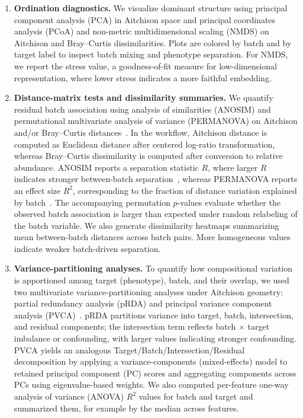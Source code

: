\documentclass[11pt,letterpaper]{article}
\begin{document}
\begin{enumerate}
\renewcommand{\labelenumi}{(\roman{enumi})}

\item \textbf{Ordination diagnostics.}
We visualize dominant structure using principal component analysis (PCA) in Aitchison space and principal coordinates analysis (PCoA) and non-metric multidimensional scaling (NMDS) on Aitchison and Bray--Curtis dissimilarities. Plots are colored by batch and by target label to inspect batch mixing and phenotype separation. For NMDS, we report the stress value, a goodness-of-fit measure for low-dimensional representation, where lower stress indicates a more faithful embedding.

\item \textbf{Distance-matrix tests and dissimilarity summaries.}
We quantify residual batch association using analysis of similarities (ANOSIM) and permutational multivariate analysis of variance (PERMANOVA) on Aitchison and/or Bray--Curtis distances~\cite{Li2019MiPro,braycurtis1957}. In the workflow, Aitchison distance is computed as Euclidean distance after centered log-ratio transformation, whereas Bray--Curtis dissimilarity is computed after conversion to relative abundance. ANOSIM reports a separation statistic $R$, where larger $R$ indicates stronger between-batch separation~\cite{Clarke1993ANOSIM}, whereas PERMANOVA reports an effect size $R^2$, corresponding to the fraction of distance variation explained by batch~\cite{anderson2001permanova}. The accompanying permutation $p$-values evaluate whether the observed batch association is larger than expected under random relabeling of the batch variable. We also generate dissimilarity heatmaps summarizing mean between-batch distances across batch pairs. More homogeneous values indicate weaker batch-driven separation.

\item \textbf{Variance-partitioning analyses.}
To quantify how compositional variation is apportioned among target (phenotype), batch, and their overlap, we used two multivariate variance-partitioning analyses under Aitchison geometry: partial redundancy analysis (pRDA) and principal variance component analysis (PVCA)~\cite{Wang2023PLSDABatch}. pRDA partitions variance into target, batch, intersection, and residual components; the intersection term reflects batch $\times$ target imbalance or confounding, with larger values indicating stronger confounding. PVCA yields an analogous Target/Batch/Intersection/Residual decomposition by applying a variance-components (mixed-effects) model to retained principal component (PC) scores and aggregating components across PCs using eigenvalue-based weights. We also computed per-feature one-way analysis of variance (ANOVA) $R^2$ values for batch and target and summarized them, for example by the median across features.


\end{enumerate}
\end{document}
